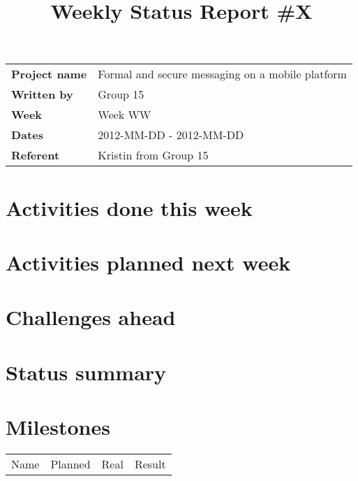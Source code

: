 \documentclass[a4paper,12pt]{article}
\begin{document}
\title{Weekly Status Report \#X}
\maketitle
\begin{tabular}{>{\bfseries}l l}	
Project name&Formal and secure messaging on a mobile platform\\
Written by&Group 15\\
Week&Week WW\\
Dates&2012-MM-DD - 2012-MM-DD\\
Referent&Kristin from Group 15\\
\end{tabular}

\section{Activities done this week}
\section{Activities planned next week}
\section{Challenges ahead}
\section{Status summary}
\section{Milestones}
\begin{tabular}{l l l l}	
Name&Planned&Real&Result
\end{tabular}
\end{document}
